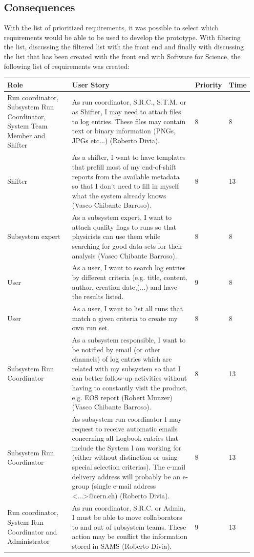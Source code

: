 \documentclass[paper=a4, fontsize=11pt,twoside]{scrartcl}	%
\begin{document}
\subsection{Consequences}
With the list of prioritized requirements, it was possible to select which requirements would be able to be used to develop the prototype. With filtering the list, discussing the filtered list with the front end and finally with discussing the list that has been created with the front end with Software for Science, the following list of requirements was created: \\
\begin{longtable}{ | p{3cm} | p{8cm} | p{1.5cm} | l |}
\hline
Role & User Story & Priority & Time \\ \hline
Run coordinator, Subsystem Run Coordinator, System Team Member and Shifter& As run coordinator, S.R.C., S.T.M. or as Shifter, I may need to attach files to log entries. These files may contain text or binary information (PNGs, JPGs etc...) (Roberto Divia). & 8 & 8 \\ \hline
Shifter &  As a shifter, I want to have templates that prefill most of my end-of-shift reports from the available metadata so that I don’t need to fill in myself what the system already knows (Vasco Chibante Barroso). & 8 & 13 \\ \hline
Subsystem expert & As a subsystem expert, I want to attach quality flags to runs so that
physicists can use them while searching for good data sets for their analysis (Vasco Chibante Barroso). & 8 & 8 \\ \hline
User & As a user, I want to search log entries by different criteria (e.g. title, content, author, creation date,(...) and have the results listed. & 9 & 8 \\ \hline
User &  As a user, I want to list all runs that match a given criteria to create my own run set. & 8 & 8 \\ \hline
Subsystem Run Coordinator &  As a subsystem responsible, I want to be notified by email (or other channels) of log entries which are related with my subsystem so that I can better follow-up activities without having to constantly visit the product, e.g. EOS report (Robert Munzer) (Vasco Chibante Barroso). & 8 & 13 \\ \hline
Subsystem Run Coordinator & As subsystem run coordinator I may request to receive automatic emails concerning all Logbook entries that include the System I am working for (either without distinction or using special selection criterias). The e-mail delivery address will probably be an e-group (single e-mail address <...>@cern.ch) (Roberto Divia). & 8 & 13 \\ \hline
Run coordinator, System Run Coordinator and Administrator &  As run coordinator, S.R.C. or Admin, I must be able to move collaborators to and out of subsystem teams. These action may be conflict the information stored in SAMS (Roberto Divia). & 9 & 13 \\ \hline
\end{longtable}
\end{document}

